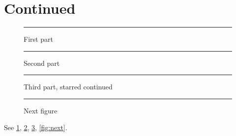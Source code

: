 \documentclass{article}
\begin{document}
\listoffigures
\section{Continued}
\begin{figure}[htbp]
\centering\rule{3cm}{1cm}
\caption{First part}\label{fig:part1}
\end{figure}
\begin{figure}[htbp]
\ContinuedFloat
\centering\rule{3cm}{1cm}
\caption{Second part}\label{fig:part2}
\end{figure}
\begin{figure}[htbp]
\ContinuedFloat*
\centering\rule{3cm}{1cm}
\caption{Third part, starred continued}\label{fig:part3}
\end{figure}
\begin{figure}[htbp]
\centering\rule{3cm}{1cm}
\caption{Next figure}\label{fig:next}
\end{figure}
See \ref{fig:part1}, \ref{fig:part2}, \ref{fig:part3}, \autoref{fig:next}.
\end{document}
